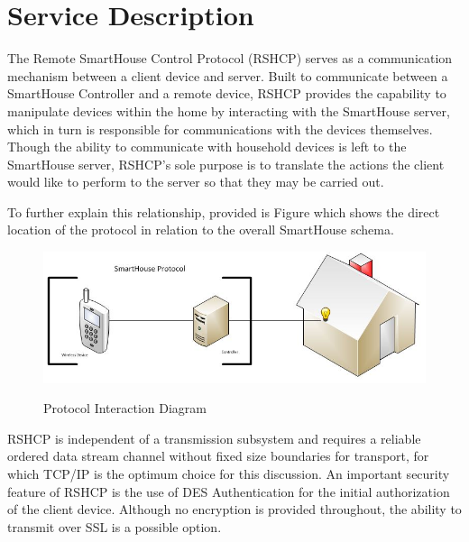 \section{Service Description}
\label{sec:serv_desc}

The Remote SmartHouse Control Protocol (RSHCP) serves as a communication mechanism between a client device and server. Built to communicate between a SmartHouse Controller and a remote device, RSHCP provides the capability to manipulate devices within the home by interacting with the SmartHouse server, which in turn is responsible for communications with the devices themselves. Though the ability to communicate with household devices is left to the SmartHouse server, RSHCP's sole purpose is to translate the actions the client would like to perform to the server so that they may be carried out. 


To further explain this relationship, provided is Figure  which shows the direct location of the protocol in relation to the overall SmartHouse schema.

\begin{figure}[h]
  \centering
  \label{fig:serv_desc:service}
  \includegraphics[width=5in]{figures/desc_img.jpg}\\
  \caption{Protocol Interaction Diagram}
\end{figure}

RSHCP is independent of a transmission subsystem and requires a reliable ordered data stream channel without fixed size boundaries for transport, for which TCP/IP is the optimum choice for this discussion. An important security feature of RSHCP is the use of DES Authentication for the initial authorization of the client device. Although no encryption is provided throughout, the ability to transmit over SSL is a possible option.



